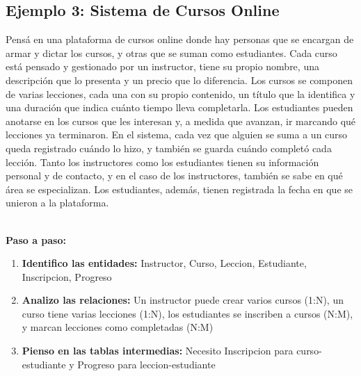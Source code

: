 \documentclass[12pt]{article}
\begin{document}
\subsection{Ejemplo 3: Sistema de Cursos Online}
Pensá en una plataforma de cursos online donde hay personas que se encargan de armar y dictar los cursos, y otras que se suman como estudiantes. Cada curso está pensado y gestionado por un instructor, tiene su propio nombre, una descripción que lo presenta y un precio que lo diferencia. Los cursos se componen de varias lecciones, cada una con su propio contenido, un título que la identifica y una duración que indica cuánto tiempo lleva completarla. Los estudiantes pueden anotarse en los cursos que les interesan y, a medida que avanzan, ir marcando qué lecciones ya terminaron. En el sistema, cada vez que alguien se suma a un curso queda registrado cuándo lo hizo, y también se guarda cuándo completó cada lección. Tanto los instructores como los estudiantes tienen su información personal y de contacto, y en el caso de los instructores, también se sabe en qué área se especializan. Los estudiantes, además, tienen registrada la fecha en que se unieron a la plataforma.

\textbf{\\Paso a paso:}
\begin{enumerate}
    \item \textbf{Identifico las entidades:} Instructor, Curso, Leccion, Estudiante, Inscripcion, Progreso
    \item \textbf{Analizo las relaciones:} Un instructor puede crear varios cursos (1:N), un curso tiene varias lecciones (1:N), los estudiantes se inscriben a cursos (N:M), y marcan lecciones como completadas (N:M)
    \item \textbf{Pienso en las tablas intermedias:} Necesito Inscripcion para curso-estudiante y Progreso para leccion-estudiante
\end{enumerate}

\vspace{0.1em}
\end{document}
